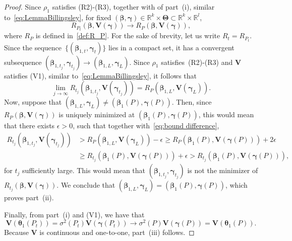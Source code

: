 \documentclass{article}
\numberwithin{equation}{section}
\theoremstyle{plain}
\newcommand{\R}{\mathbb{R}}
\newcommand{\bbeta}{\bm\beta}
\newcommand{\btheta}{\bm\theta}
\newcommand{\bgamma}{\bm\gamma}
\newcommand{\bTheta}{\bm\Theta}
\newcommand{\bV}{\mathbf{V}}
\begin{document}
\begin{proof}
Since $\rho_1$ satisfies (R2)-(R3),
together with of part~(i), similar to~\eqref{eq:LemmaBillingsley},
for fixed $(\bbeta,\bgamma)\in\R^k\times\bTheta\subset\R^k\times\R^l$,
\begin{equation}\label{eq:bound difference}
R_{P_t}(\bbeta,\bV(\bgamma))\to R_P(\bbeta,\bV(\bgamma)),
\end{equation}
where $R_P$ is defined in~\eqref{def:R_P}.
For the sake of brevity, let us write $R_t=R_{P_t}$.
Since the sequence~$\{(\bbeta_{1,t},\bgamma_t)\}$ lies in a compact set, 
it has a convergent subsequence
$(\bbeta_{1,t_j},\bgamma_{t_j})\to(\bbeta_{1,L},\bgamma_{L})$.
Since $\rho_1$ satisfies~(R2)-(R3) and $\bV$ satisfies (V1), 
similar to~\eqref{eq:LemmaBillingsley}, it follows that
\[
\lim_{j\to\infty}
R_{t_j}(\bbeta_{1,t_j},\bV(\bgamma_{t_j}))
=
R_P(\bbeta_{1,L},\bV(\bgamma_{L})).
\]
Now, suppose that $(\bbeta_{1,L},\bgamma_{L})\neq (\bbeta_1(P),\bgamma(P))$.
Then, since $R_P(\bbeta,\bV(\bgamma))$ is uniquely minimized at $(\bbeta_1(P),\bgamma(P))$,
this would mean that there exists $\epsilon>0$, such that together with~\eqref{eq:bound difference},
\[
\begin{split}
R_{t_j}(\bbeta_{1,t_j},\bV(\bgamma_{t_j}))
&>
R_P(\bbeta_{1,L},\bV(\bgamma_{L}))-\epsilon
\geq
R_P(\bbeta_1(P),\bV(\bgamma(P)))+2\epsilon\\
&\geq
R_{t_j}(\bbeta_1(P),\bV(\bgamma(P)))+\epsilon
>
R_{t_j}(\bbeta_1(P),\bV(\bgamma(P))),
\end{split}
\]
for $t_j$ sufficiently large.
This would mean that $(\bbeta_{1,t_j},\bgamma_{t_j})$ is not the minimizer of $R_{t_j}(\bbeta,\bV(\bgamma))$.
We conclude that $(\bbeta_{1,L},\bgamma_{L})=(\bbeta_1(P),\bgamma(P))$, which proves part~(ii).

Finally, from part~(i) and (V1), we have that
\[
\bV(\btheta_1(P_t))
=
\sigma^2(P_t)\bV(\bgamma(P_t))
\to
\sigma^2(P)\bV(\bgamma(P))
=
\bV(\btheta_1(P)).
\]
Because $\bV$ is continuous and one-to-one, part~(iii) follows.
\end{proof}
\end{document}
